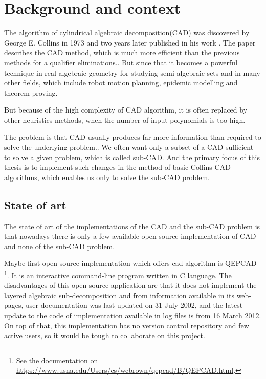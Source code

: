 \documentclass[
  digital, %
  twoside, %
  table,   %
  nolof,     %
  nolot,     %
]{fithesis3}
\begin{document}
\chapter{Background and context}
The algorithm of cylindrical algebraic decomposition(CAD) was discovered by George E. Collins in 1973 and two years later published in his work . The paper describes the CAD method, which is much more efficient than the previous methods for a qualifier eliminations.\cite{10.1007/3-540-07407-4_17}. But since that it becomes a powerful technique in real algebraic geometry for studying semi-algebraic sets and in many other fields, which include robot motion planning\cite{LaValle:2006:PA:1213331},
epidemic modelling\cite{epidemicModeling} and theorem proving\cite{10.1007/978-3-642-32347-8_1}.

But because of the high complexity of CAD algorithm, it is often replaced by other heuristics methods, when the number of input polynomials is too high.

The problem is that CAD usually produces far more information than required to solve the underlying problem.\cite{Wilson2014}. We often want only a subset of a CAD sufficient to solve a given problem, which is called sub-CAD. And the primary focus of this thesis is to implement such changes in the method of basic Collins CAD algorithms, which enables us only to solve the sub-CAD problem. 

\section{State of art}
The state of art of the implementations of the CAD and the sub-CAD problem is that nowadays there is only a few available open source implementation of CAD and none of the sub-CAD problem.

Maybe first open source implementation which offers cad algorithm is QEPCAD
\footnote{
  See the documentation on \url{https://www.usna.edu/Users/cs/wcbrown/qepcad/B/QEPCAD.html}.
}. It is an interactive command-line program written in C language. The disadvantages of this open source application are that it does not implement the layered algebraic sub-decomposition and from information available in its web-pages, user documentation was last updated on 31 July 2002, and the latest update to the code of implementation available in log files is from 16 March 2012. On top of that, this implementation has no version control repository and few active users, so it would be tough to collaborate on this project.
\end{document}
